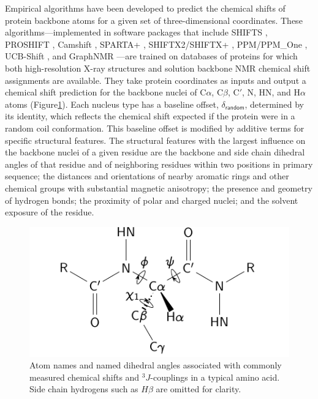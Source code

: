 \documentclass[9pt,review,pubversion]{livecoms}
\begin{document}
Empirical algorithms have been developed to predict the chemical shifts of protein backbone atoms for a given set of three-dimensional coordinates.
These algorithms---implemented in software packages that include SHIFTS \cite{xu_automated_2001}, PROSHIFT \cite{meiler_proshift_2003}, Camshift \cite{kohlhoff_fast_2009}, SPARTA+ \cite{shen_sparta_2010}, SHIFTX2/SHIFTX+ \cite{han_shiftx2_2011}, PPM/PPM\_One \cite{li_ppm_2012,li_ppm_one_2015}, UCB-Shift \cite{li_accurate_2020}, and GraphNMR \cite{yang_predicting_2021}---are trained on databases of proteins for which both high-resolution X-ray structures and solution backbone NMR chemical shift assignments are available.
They take protein coordinates as inputs and output a chemical shift prediction for the backbone nuclei of C$\alpha$, C$\beta$, C$'$, N, HN, and H$\alpha$ atoms (Figure\ref{fig:dihedrals}).
Each nucleus type has a baseline offset, $\delta_{\mathsf{random}}$, determined by its identity, which reflects the chemical shift expected if the protein were in a random coil conformation.
This baseline offset is modified by additive terms for specific structural features.
The structural features with the largest influence on the backbone nuclei of a given residue are the backbone and side chain dihedral angles of that residue and of neighboring residues within two positions in primary sequence; the distances and orientations of nearby aromatic rings and other chemical groups with substantial magnetic anisotropy; the presence and geometry of hydrogen bonds; the proximity of polar and charged nuclei; and the solvent exposure of the residue.

\begin{figure}[t]
    \centering
    \includegraphics[width=3 in]{protein-dihedrals.pdf}
    \caption{Atom names and named dihedral angles associated with commonly measured chemical shifts and $^3J$-couplings in a typical amino acid.
    Side chain hydrogens such as $H\beta$ are omitted for clarity.}
    \label{fig:dihedrals}
\end{figure}
\end{document}

